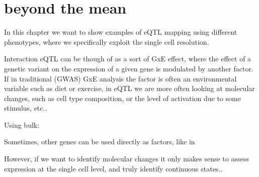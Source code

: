 

\section{beyond the mean}

In this chapter we want to show examples of eQTL mapping using different phenotypes, where we specifically exploit the single cell resolution.

Interaction eQTL can be though of as a sort of GxE effect, where the effect of a genetic variant on the expression of a given gene is modulated by another factor.
If in traditional (GWAS) GxE analysis the factor is often an environmental variable such as diet or exercise, in eQTL we are more often looking at molecular changes, such as cell type composition, or the level of activation due to some stimulus, etc..

Using bulk:

Sometimes, other genes can be used directly as factors, like in \cite{zhernakova2017identification}

However, if we want to identify molecular changes it only makes sense to assess expression at the single cell level, and truly identify continuous states..




